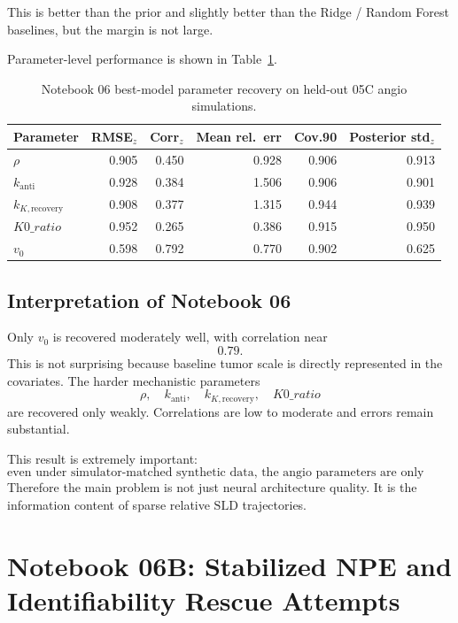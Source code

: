 \documentclass[11pt,a4paper]{article}
\newcommand{\sld}{\ensuremath{\mathrm{SLD}}}
\begin{document}
This is better than the prior and slightly better than the Ridge / Random Forest baselines, but the margin is not large.

Parameter-level performance is shown in Table~\ref{tab:n06-param}.

\begin{table}[H]
\centering
\small
\caption{Notebook 06 best-model parameter recovery on held-out 05C angio simulations.}
\label{tab:n06-param}
\begin{tabular}{lrrrrr}
\toprule
Parameter & RMSE$_z$ & Corr$_z$ & Mean rel.\ err & Cov.90 & Posterior std$_z$ \\
\midrule
$\rho$ & 0.905 & 0.450 & 0.928 & 0.906 & 0.913 \\
$k_{\mathrm{anti}}$ & 0.928 & 0.384 & 1.506 & 0.906 & 0.901 \\
$k_{K,\mathrm{recovery}}$ & 0.908 & 0.377 & 1.315 & 0.944 & 0.939 \\
$K0\_ratio$ & 0.952 & 0.265 & 0.386 & 0.915 & 0.950 \\
$v_0$ & 0.598 & 0.792 & 0.770 & 0.902 & 0.625 \\
\bottomrule
\end{tabular}
\end{table}

\subsection{Interpretation of Notebook 06}

Only $v_0$ is recovered moderately well, with correlation near
\[
    0.79.
\]
This is not surprising because baseline tumor scale is directly represented in the covariates. The harder mechanistic parameters
\[
    \rho,\quad k_{\mathrm{anti}},\quad k_{K,\mathrm{recovery}},\quad K0\_ratio
\]
are recovered only weakly. Correlations are low to moderate and errors remain substantial.

This result is extremely important:
\[
\boxed{
\text{even under simulator-matched synthetic data, the angio parameters are only weakly recoverable}
}
\]
Therefore the main problem is not just neural architecture quality. It is the information content of sparse relative \sld{} trajectories.

\section{Notebook 06B: Stabilized NPE and Identifiability Rescue Attempts}
\end{document}
